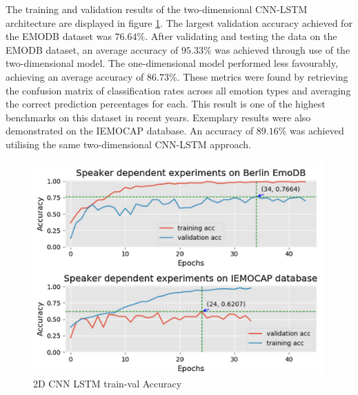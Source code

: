 The training and validation results of the two-dimensional CNN-LSTM architecture are displayed in figure \ref{zhao2019_train_fig}. The largest validation accuracy achieved for the EMODB dataset was $76.64\%$. After validating and testing the data on the EMODB dataset, an average accuracy of $95.33\%$ was achieved through use of the two-dimensional model. The one-dimensional model performed less favourably, achieving an average accuracy of $86.73\%$. These metrics were found by retrieving the confusion matrix of classification rates across all emotion types and averaging the correct prediction percentages for each. This result is one of the highest benchmarks on this dataset in recent years. Exemplary results were also demonstrated on the IEMOCAP database. An accuracy of $89.16\%$ was achieved utilising the same two-dimensional CNN-LSTM approach. 
\begin{figure}[h]
        \centering
        \includegraphics[scale = 0.8]{images/Zhao-2dCNN_trainvalResults.png}
        \caption{2D CNN LSTM train-val Accuracy \cite{ZHAO2019}}
        \label{zhao2019_train_fig}
\end{figure}

